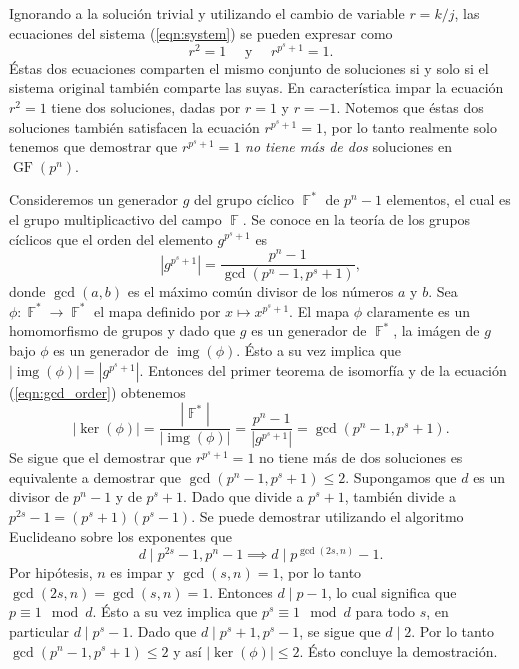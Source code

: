 \documentclass[a4paper,11pt]{report}
\DeclareMathOperator{\F}{\mathbb{F}}
\DeclareMathOperator{\GF}{GF}
\DeclareMathOperator{\img}{img}
\begin{document}
  Ignorando a la solución trivial y utilizando el cambio de
  variable $r = k / j$, las ecuaciones del sistema
  (\ref{eqn:system}) se pueden expresar como
  \begin{equation}
    r^2 = 1
    \quad \text{ y } \quad
    r^{p^{s}+1} = 1.
  \end{equation}
  Éstas dos ecuaciones comparten el mismo conjunto de
  soluciones si y solo si el sistema original también
  comparte las suyas. En característica impar la
  ecuación $r^2 = 1$ tiene dos soluciones, dadas por $r = 1$ 
  y $r = -1$. Notemos que éstas dos soluciones también
  satisfacen la ecuación $r^{p^{s}+1} = 1$, por lo tanto
  realmente solo tenemos que demostrar que $r^{p^{s}+1} = 1$ 
  \textit{no tiene más de dos} soluciones en $\GF(p^{n})$.

  Consideremos un generador $g$ del grupo cíclico $\F^{*}$ 
  de $p^{n}-1$ elementos, el cual es el grupo
  multiplicactivo del campo $\F$. Se conoce en la teoría de
  los grupos cíclicos que el orden del elemento
  $g^{p^{s}+1}$ es
  \begin{equation}
    \label{eqn:gcd_order}
    \left|g^{p^{s}+1}\right|
    = \frac{p^{n}-1}{\gcd(p^{n}-1, p^{s}+1)},
  \end{equation}
  donde $\gcd(a,b)$ es el máximo común divisor de los
  números $a$ y $b$. Sea $\phi : \F^{*} \to \F^{*}$ el mapa
  definido por $x \mapsto x^{p^{s}+1}$. El mapa $\phi$ 
  claramente es un homomorfismo de grupos y dado que $g$ es
  un generador de $\F^{*}$, la imágen de $g$ bajo $\phi$ es
  un generador de $\img(\phi)$. Ésto a su vez implica que
  $|\img(\phi)| = \left|g^{p^{s}+1}\right|$. Entonces del
  primer teorema de isomorfía y de la ecuación
  (\ref{eqn:gcd_order}) obtenemos
  \begin{equation}
    \label{eqn:kernel_order}
    |\ker(\phi)|
    = \frac{|\F^{*}|}{|\img(\phi)|}
    = \frac{p^{n}-1}{|g^{p^{s}+1}|}
    = \gcd(p^{n}-1, p^{s} + 1).
  \end{equation}
  Se sigue que el demostrar que $r^{p^{s}+1} = 1$ no tiene
  más de dos soluciones es equivalente a demostrar que
  $\gcd(p^{n}-1, p^{s}+1) \leq 2$. Supongamos que $d$ es un
  divisor de $p^{n}-1$ y de $p^{s}+1$. Dado que divide a
  $p^{s}+1$, también divide a $p^{2s}-1 =
  (p^{s}+1)(p^{s}-1)$. Se puede demostrar utilizando el
  algoritmo Euclideano sobre los exponentes que 
  \[
    d \mid p^{2s} - 1, p^{n}-1
    \implies
    d \mid p^{\gcd(2s,n)} - 1.
  \] 
  Por hipótesis, $n$ es impar y $\gcd(s,n) = 1$, por lo
  tanto $\gcd(2s,n) = \gcd(s,n) = 1$. Entonces $d \mid p -
  1$, lo cual significa que $p \equiv 1 \mod d$. Ésto a su
  vez implica que $p^{s} \equiv 1 \mod d$ para todo $s$, en
  particular $d \mid p^{s} - 1$. Dado que $d \mid p^{s}+1,
  p^{s}-1$, se sigue que $d \mid 2$. Por lo tanto
  $\gcd(p^{n}-1, p^{s}+1) \leq 2$ y así $|\ker(\phi)| \leq
  2$. Ésto concluye la demostración. 
\end{document}
